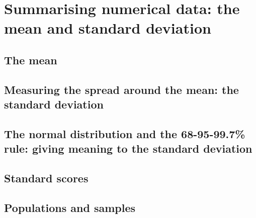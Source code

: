 \documentclass[a4paper,11pt]{article}
\begin{document}
\section{Summarising numerical data: the mean and standard deviation}
\begin{outline}

\0
\subsection{The mean}

\0
\subsection{Measuring the spread around the mean: the standard deviation}

\0
\subsection{The normal distribution and the 68-95-99.7\% rule: giving meaning to the standard deviation}

\0
\subsection{Standard scores}

\0
\subsection{Populations and samples}

\end{outline}

\newpage
\end{document}
